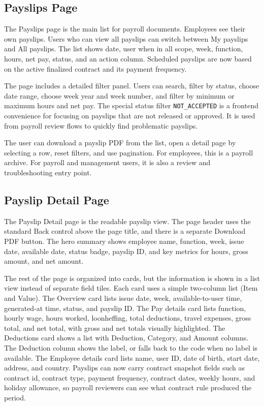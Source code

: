 \documentclass[11pt]{article}
\newcommand{\code}[1]{\nolinkurl{#1}}
\begin{document}
\subsection{Payslips Page}

The Payslips page is the main list for payroll documents. Employees see their own payslips. Users who can view all payslips can switch between My payslips and All payslips. The list shows date, user when in all scope, week, function, hours, net pay, status, and an action column. Scheduled payslips are now based on the active finalized contract and its payment frequency.

The page includes a detailed filter panel. Users can search, filter by status, choose date range, choose week year and week number, and filter by minimum or maximum hours and net pay. The special status filter \code{NOT_ACCEPTED} is a frontend convenience for focusing on payslips that are not released or approved. It is used from payroll review flows to quickly find problematic payslips.

The user can download a payslip PDF from the list, open a detail page by selecting a row, reset filters, and use pagination. For employees, this is a payroll archive. For payroll and management users, it is also a review and troubleshooting entry point.

\subsection{Payslip Detail Page}

The Payslip Detail page is the readable payslip view. The page header uses the standard Back control above the page title, and there is a separate Download PDF button. The hero summary shows employee name, function, week, issue date, available date, status badge, payslip ID, and key metrics for hours, gross amount, and net amount.

The rest of the page is organized into cards, but the information is shown in a list view instead of separate field tiles. Each card uses a simple two-column list (Item and Value). The Overview card lists issue date, week, available-to-user time, generated-at time, status, and payslip ID. The Pay details card lists function, hourly wage, hours worked, loonheffing, total deductions, travel expenses, gross total, and net total, with gross and net totals visually highlighted. The Deductions card shows a list with Deduction, Category, and Amount columns. The Deduction column shows the label, or falls back to the code when no label is available. The Employee details card lists name, user ID, date of birth, start date, address, and country. Payslips can now carry contract snapshot fields such as contract id, contract type, payment frequency, contract dates, weekly hours, and holiday allowance, so payroll reviewers can see what contract rule produced the period.
\end{document}

